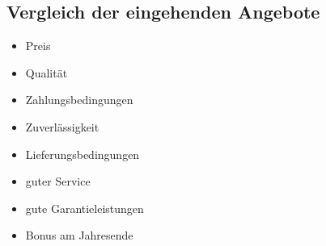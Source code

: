 \documentclass[a4paper,11pt]{scrartcl}	%
\begin{document}
\newpage	
	
	\subsection{Vergleich der eingehenden Angebote}
	\begin{itemize}
	\item Preis
	\item Qualität
	\item Zahlungsbedingungen
	\item Zuverlässigkeit
	\item Lieferungsbedingungen
	\item guter Service
	\item gute Garantieleistungen
	\item Bonus am Jahresende
	\end{itemize}
	
\end{document}
